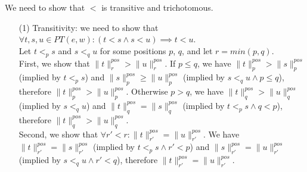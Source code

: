 \documentclass[AMA,STIX1COL]{WileyNJD-v2}
\newcommand{\PT}{PT}
\newcommand{\pnorm}[2]{\|{#1}\|^{pos}_{#2}}
\begin{document}
\begin{proofEnd}
    We need to show that $<$ is transitive and trichotomous.
    \begin{itemize}[itemsep=0.5em, topsep=0.5em]
        \item[(1)]
            Transitivity: we need to show that $\forall t, s, u \in \PT(e,w): (t < s \wedge s < u) \implies t < u$.
            \\[0.5em]
            Let $t <_p s$ and $s <_q u$ for some positions $p$, $q$, and let $r = min (p, q)$.
            \\[0.5em]
            First, we show that $\pnorm{t}{r} > \pnorm{u}{r}$.
            If $p \leq q$, we have $\pnorm{t}{p} > \pnorm{s}{p}$ (implied by $t <_p s$)
            and $\pnorm{s}{p} \geq \pnorm{u}{p}$ (implied by $s <_q u \wedge p \leq q$),
            therefore $\pnorm{t}{p} > \pnorm{u}{p}$.
            Otherwise $p > q$, we have $\pnorm{t}{q} > \pnorm{u}{q}$ (implied by $s <_q u$)
            and $\pnorm{t}{q} = \pnorm{s}{q}$ (implied by $t <_p s \wedge q < p$),
            therefore $\pnorm{t}{q} > \pnorm{u}{q}$.
            \\[0.5em]
            Second, we show that $\forall r' < r : \pnorm{t}{r'} = \pnorm{u}{r'}$.
            We have $\pnorm{t}{r'} = \pnorm{s}{r'}$ (implied by $t <_p s \wedge r' < p$)
            and $\pnorm{s}{r'} = \pnorm{u}{r'}$ (implied by $s <_q u \wedge r' < q$),
            therefore $\pnorm{t}{r'} = \pnorm{u}{r'}$.


\end{itemize}
\end{proofEnd}
\end{document}
